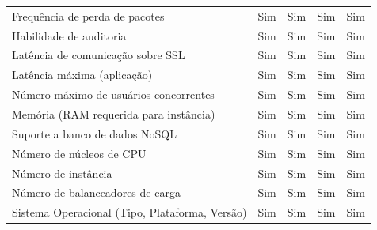 \documentclass[conference]{IEEEtran}
\begin{document}
\begin{table}[]
\begin{tabular}{@{}lcccc@{}}
Frequência de perda de pacotes                    & Sim                                     & Sim                                     & Sim                                     & Sim                         \\
Habilidade de auditoria                           & Sim                                     & Sim                                     & Sim                                     & Sim                         \\
Latência de comunicação sobre SSL                 & Sim                                     & Sim                                     & Sim                                     & Sim                         \\
Latência máxima (aplicação)                       & Sim                                     & Sim                                     & Sim                                     & Sim                         \\
Número máximo de usuários concorrentes            & Sim                                     & Sim                                     & Sim                                     & Sim                         \\
Memória (RAM requerida para instância)            & Sim                                     & Sim                                     & Sim                                     & Sim                         \\
Suporte a banco de dados NoSQL                    & Sim                                     & Sim                                     & Sim                                     & Sim                         \\
Número de núcleos de CPU                          & Sim                                     & Sim                                     & Sim                                     & Sim                         \\
Número de instância                               & Sim                                     & Sim                                     & Sim                                     & Sim                         \\
Número de balanceadores de carga                  & Sim                                     & Sim                                     & Sim                                     & Sim                         \\
Sistema Operacional (Tipo, Plataforma, Versão)    & Sim                                     & Sim                                     & Sim                                     & Sim                         \\

\end{tabular}
\end{table}
\end{document}
